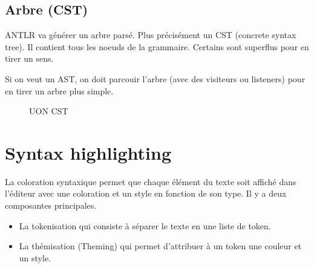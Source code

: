 \documentclass[
    iict, %
    il, %
]{heig-tb}
\begin{document}
\subsection{Arbre (CST)}


ANTLR va générer un arbre parsé. Plus précisément un CST (concrete syntax tree).
Il contient tous les noeuds de la grammaire. Certains sont superflus pour en tirer un sens.

Si on veut un AST, on doit parcouir l'arbre (avec des visiteurs ou listeners) pour en tirer un arbre plus simple.

\begin{figure}[!h]
    \begin{center}
    \end{center}
    \caption[UON CST]{\label{uon-tree} UON CST}
\end{figure}


\section{Syntax highlighting}

La coloration syntaxique permet que chaque élément du texte soit affiché dans l'éditeur avec une coloration et un style en fonction de son type.
Il y a deux composantes principales.
\begin{itemize}
    \item La tokenisation qui consiste à séparer le texte en une liste de token.
    \item La thémisation (Theming) qui permet d'attribuer à un token une couleur et un style.
\end{itemize}
\end{document}
